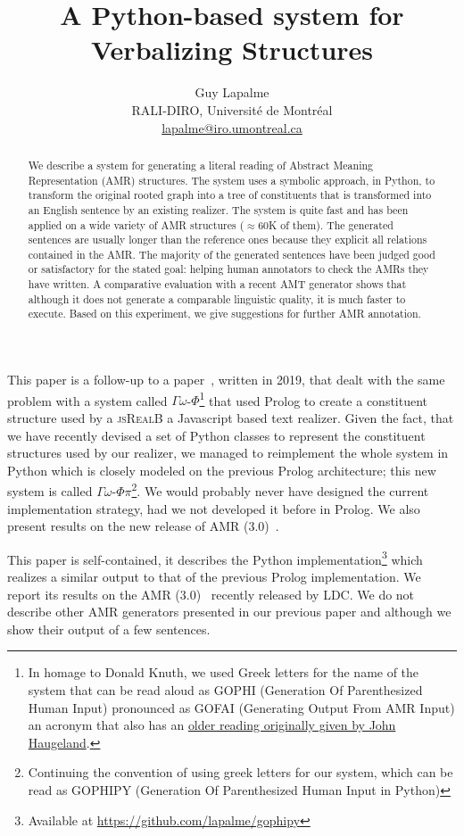\documentclass[12pt]{article}
\title{A Python-based system for Verbalizing \AMR{} Structures}
\author{Guy Lapalme\\
      RALI-DIRO, Université de Montréal\\
      \url{lapalme@iro.umontreal.ca}}
\date{}
\newcommand{\systeme}[1]{\textsc{#1}}
\newcommand{\jsr}{\systeme{jsRealB}}
\newcommand{\gophi}{$\Gamma\omega$-$\Phi$}
\newcommand{\gophipy}{$\Gamma\omega$-$\Phi\pi$}
\newcommand{\representation}[1]{\textsf{#1}}
\newcommand{\AMR}{\representation{AMR}}
\begin{document}
\maketitle

\begin{abstract}
We describe a system for generating a literal reading of Abstract Meaning Representation (AMR) structures. The system uses a symbolic approach, in Python, to transform the original rooted graph into a tree of constituents that is transformed into an English sentence by an existing realizer. The system is quite fast and has been applied on a wide variety of AMR structures ($\approx{}$60K of them). The generated sentences are usually longer than the reference ones because they explicit all relations contained in the AMR. 
The majority of the generated sentences have been judged good or satisfactory for the stated goal: helping human annotators to check the AMRs they have written. A comparative evaluation with a recent AMT generator shows that although it does not generate a comparable linguistic quality, it is much faster to execute. Based on this experiment, we give suggestions for further AMR annotation.
\end{abstract}

This paper is a follow-up to a paper~\cite{VerbalizingAMR2019Lapalme}, written in 2019, that dealt with the same problem with a system called \gophi{}\footnote{In homage to Donald Knuth, we used Greek letters for the name of the system that can be read aloud as GOPHI (Generation Of Parenthesized Human Input) pronounced as GOFAI (Generating Output From AMR Input) an acronym that also has an \href{https://en.wikipedia.org/wiki/Symbolic_artificial_intelligence}{older reading originally given by John Haugeland}.} that used Prolog to create a constituent structure used by a \jsr{} a Javascript based text realizer.  Given the fact, that we have recently devised a set of Python classes to represent the constituent structures used by our realizer, we managed to reimplement the whole system in Python which is closely modeled on the previous Prolog architecture; this new system is called \gophipy{}\footnote{Continuing the convention of using greek letters for our system, which can be read as GOPHIPY (Generation Of Parenthesized Human Input in Python)}. We would probably never have designed the current implementation strategy, had we not developed it before in Prolog. We also present results on the new release of \AMR{} (3.0)~\cite{AMR-Release3}.  

This paper is self-contained, it describes the Python implementation\footnote{Available at \url{https://github.com/lapalme/gophipy}} which realizes a similar output to that of the previous Prolog implementation. We report its results on the AMR (3.0)~\cite{AMR-Release3} recently released by LDC.   We do not describe other AMR generators presented in our previous paper and although we show their output of a few sentences.
\end{document}
